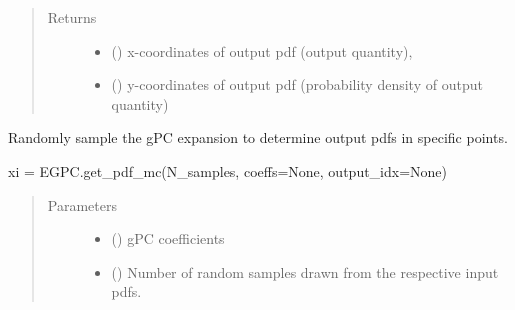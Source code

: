 \documentclass[letterpaper,10pt,english,openany,oneside]{sphinxmanual}
\begin{document}
\begin{fulllineitems}
\begin{fulllineitems}
\begin{quote}
\begin{description}
\begin{itemize}
\end{itemize}

\item[{Returns}] \leavevmode
\begin{itemize}
\item {} 
 () \textendash{} x-coordinates of output pdf (output quantity),

\item {} 
 () \textendash{} y-coordinates of output pdf (probability density of output quantity)

\end{itemize}


\end{description}\end{quote}

\end{fulllineitems}


\begin{fulllineitems}
\label{\detokenize{pygpc:pygpc.EGPC.EGPC.get_samples}}
Randomly sample the gPC expansion to determine output pdfs in specific points.

xi = EGPC.get\_pdf\_mc(N\_samples, coeffs=None, output\_idx=None)
\begin{quote}\begin{description}
\item[{Parameters}] \leavevmode\begin{itemize}
\item {} 
 (\sphinxstyleliteralemphasis{\sphinxupquote{{[}}}\sphinxstyleliteralemphasis{\sphinxupquote{{]} }}\sphinxstyleliteralemphasis{\sphinxupquote{, }}\sphinxstyleliteralemphasis{\sphinxupquote{, }}) \textendash{} gPC coefficients

\item {} 
 () \textendash{} Number of random samples drawn from the respective input pdfs.


\end{itemize}
\end{description}
\end{quote}
\end{fulllineitems}
\end{fulllineitems}
\end{document}

